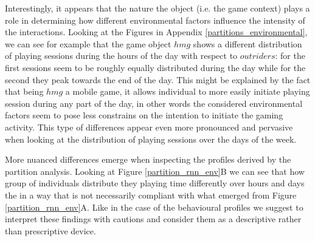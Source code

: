 Interestingly, it appears that the nature the object (i.e. the game context) plays a role in determining how different environmental factors influence the intensity of the interactions. Looking at the Figures in Appendix \ref{partitions_environmental}, we can see for example that the game object $hmg$ shows a different distribution of playing sessions during the hours of the day with respect to $outriders$: for the first sessions seem to be roughly equally distributed during the day while for the second they peak towards the end of the day. This might be explained by the fact that being $hmg$ a mobile game, it allows individual to  more easily initiate playing session during any part of the day, in other words the considered environmental factors seem to pose less constrains on the intention to initiate the gaming activity. This type of differences appear even more pronounced and pervasive when looking at the distribution of playing sessions over the days of the week. 

More nuanced differences emerge when inspecting the profiles derived by the partition analysis. Looking at Figure \ref{partition_rnn_env}B we can see that how group of individuals distribute they playing time differently over hours and days the in a way that is not necessarily compliant with what emerged from Figure \ref{partition_rnn_env}A. Like in the case of the behavioural profiles we suggest to interpret these findings with cautions and consider them as a descriptive rather than prescriptive device. 

